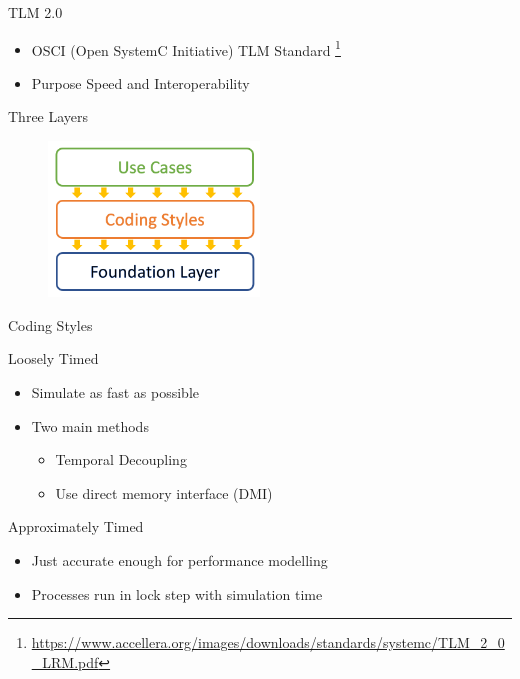 \begin{frame}{TLM 2.0}
	\begin{itemize}
		\item OSCI (Open SystemC Initiative) TLM Standard \footnote{\url{https://www.accellera.org/images/downloads/standards/systemc/TLM_2_0_LRM.pdf}}
		\item Purpose Speed and Interoperability
	\end{itemize}
\begin{block}{Three Layers}
\begin{figure}
\label{fig:tlm2}
\centering
\includegraphics[width=0.5\textwidth]{pictures/Layers.PNG}
\end{figure}
\end{block}
\end{frame}
\begin{frame}{Coding Styles}
\begin{block}{Loosely Timed}
	\begin{itemize}
		\item Simulate as fast as possible
		\item Two main methods
		\begin{itemize}
			\item Temporal Decoupling
			\item Use direct memory interface (DMI)
		\end{itemize}
	\end{itemize}
\end{block}
\begin{block}{Approximately Timed}
	\begin{itemize}
		\item Just accurate enough for performance modelling
		\item Processes run in lock step with simulation time
	\end{itemize}
\end{block}
\end{frame}
